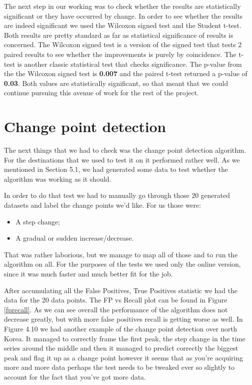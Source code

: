 \documentclass[minf,twoside,singlespacing,parskip,frontabs,notimes,12pt]{infthesis} %
\begin{document}
The next step in our working was to check whether the results are statistically significant or they have occurred by change. In order to see whether the results are indeed significant we used the Wilcoxon signed test and the Student t-test. Both results are pretty standard as far as statistical significance of results is concerned. The Wilcoxon signed test is a version of the signed test that tests 2 paired results to see whether the improvements is purely by coincidence. The t-test is another classic statistical test that checks significance. The p-value from the the Wilcoxon signed test is \textbf{0.007} and the paired t-test returned a p-value of \textbf{0.03}. Both values are statistically significant, so that meant that we could continue pursuing this avenue of work for the rest of the project. 

\section{Change point detection}

The next things that we had to check was the change point detection algorithm. For the destinations that we used to test it on it performed rather well. As we mentioned in Section 5.1, we had generated some data to test whether the algorithm was working as it should.

In order to do that test we had to manually go through those 20 generated datasets and label the change points we'd like. For us those were:
\begin{itemize}
\item A step change;
\item A gradual or sudden increase/decrease.
\end{itemize}
That was rather laborious, but we manage to map all of those and to run the algorithm on all. For the purposes of the tests we used only the online version, since it was much faster and much better fit for the job. 

After accumulating all the False Positives, True Positives statistic we had the data for the 20 data points. The FP vs Recall plot can be found in Figure \ref{fprecall}. As we can see overall the performance of the algorithm does not decrease greatly, but with more false positives recall is getting worse as well. In Figure 4.10 we had another example of the change point detection over north Korea. It managed to correctly frame the first peak, the step change in the time series around the middle and then it managed to predict correctly the biggest peak and flag it up as a change point however it seems that as you're acquiring more and more data perhaps the test needs to be tweaked ever so slightly to account for the fact that you've got more data.
\end{document}
